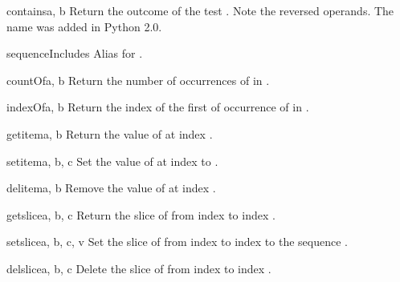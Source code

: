 \begin{funcdesc}{contains}{a, b}
Return the outcome of the test   .
Note the reversed operands.  The name  was
added in Python 2.0.
\end{funcdesc}

\begin{funcdesc}{sequenceIncludes}{\unspecified}
Alias for .
\end{funcdesc}

\begin{funcdesc}{countOf}{a, b}
Return the number of occurrences of  in .
\end{funcdesc}

\begin{funcdesc}{indexOf}{a, b}
Return the index of the first of occurrence of  in .
\end{funcdesc}

\begin{funcdesc}{getitem}{a, b}
Return the value of  at index .
\end{funcdesc}

\begin{funcdesc}{setitem}{a, b, c}
Set the value of  at index  to .
\end{funcdesc}

\begin{funcdesc}{delitem}{a, b}
Remove the value of  at index .
\end{funcdesc}

\begin{funcdesc}{getslice}{a, b, c}
Return the slice of  from index  to index .
\end{funcdesc}

\begin{funcdesc}{setslice}{a, b, c, v}
Set the slice of  from index  to index  to the
sequence .
\end{funcdesc}

\begin{funcdesc}{delslice}{a, b, c}
Delete the slice of  from index  to index .
\end{funcdesc}

